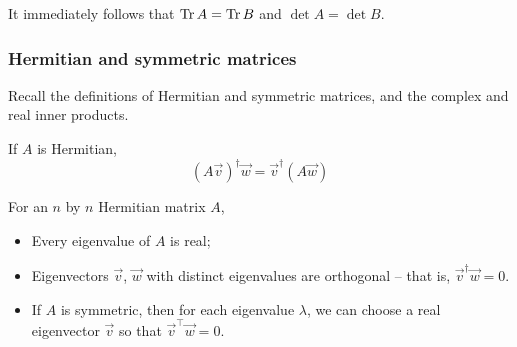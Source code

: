 \documentclass{../template/note}
\begin{document}
    \begin{corollary}
        It immediately follows that \(\operatorname{Tr} A = \operatorname{Tr} B\) and \(\det A = \det B\).
    \end{corollary}
    
    \subsubsection{Hermitian and symmetric matrices}
    
    Recall the definitions of Hermitian and symmetric matrices, and the complex and real inner products.

    \begin{remark*}
        If \(A\) is Hermitian,
        \[
            (A \vec v)^\dagger \vec w = \vec v^\dagger (A \vec w)
        \]
    \end{remark*}
    
    \begin{theorem}
        For an \(n\) by \(n\) Hermitian matrix \(A\),
        \begin{itemize}
            \item Every eigenvalue of \(A\) is real;
            \item Eigenvectors \(\vec v\), \(\vec w\) with distinct eigenvalues are orthogonal -- that is, \(\vec v^\dagger \vec w = 0\).
            \item If \(A\) is symmetric, then for each eigenvalue \(\lambda\), we can choose a real eigenvector \(\vec v\) so that \(\vec v^\intercal \vec w = 0\).
        \end{itemize}
    \end{theorem}
    
\end{document}

